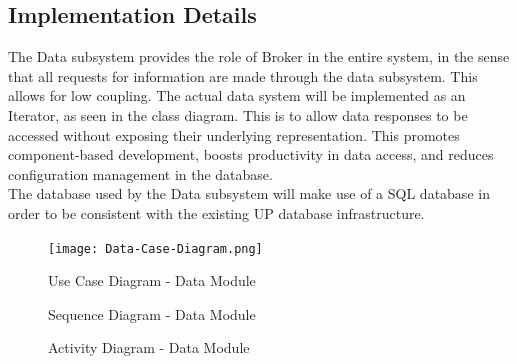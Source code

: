 \documentclass[english]{article}
\begin{document}
        \subsection{Implementation Details}
        The Data subsystem provides the role of Broker in the entire system, in the sense that all requests for information are made through the data subsystem. This allows for low coupling. The actual data system will be implemented as an Iterator, as seen in the class diagram. This is to allow data responses to be accessed without exposing their underlying representation. This promotes component-based development, boosts productivity in data access, and reduces configuration management in the database.\\
        The database used by the Data subsystem will make use of a SQL database in order to be consistent with the existing UP database infrastructure.
        
        \begin{figure}[H]
            \centering              
            \centerline{\texttt{[image: Data-Case-Diagram.png]}}
            \caption{Use Case Diagram - Data Module}
        \end{figure}
        
        \begin{figure}[H]
            \centering              
            \centerline{}
            \caption{Sequence Diagram - Data Module}
        \end{figure} 

        \begin{figure}[H]
            \centering              
            \centerline{}
            \caption{Activity Diagram - Data Module}

        \end{figure} 
        
\end{document}
